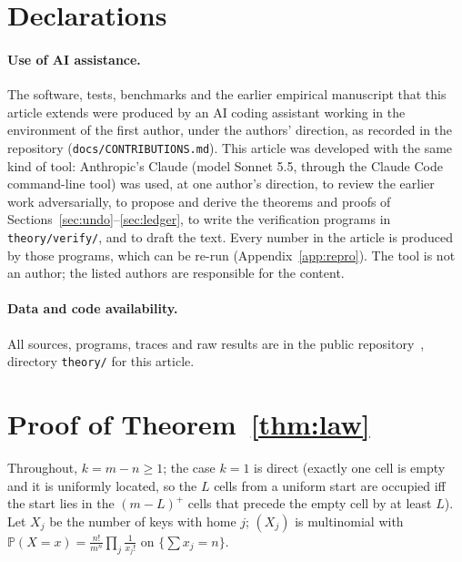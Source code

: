\documentclass[11pt,a4paper]{article}
\theoremstyle{definition}
\theoremstyle{remark}
\newcommand{\Prob}{\mathbb{P}}
\newcommand{\code}[1]{\texttt{#1}}
\begin{document}
\section*{Declarations}
\paragraph{Use of AI assistance.} The software, tests, benchmarks and the earlier empirical manuscript that this article extends were produced by an AI coding assistant working in the environment of the first author, under the authors' direction, as recorded in the repository (\code{docs/CONTRIBUTIONS.md}). This article was developed with the same kind of tool: Anthropic's Claude (model Sonnet 5.5, through the Claude Code command-line tool) was used, at one author's direction, to review the earlier work adversarially, to propose and derive the theorems and proofs of Sections~\ref{sec:undo}--\ref{sec:ledger}, to write the verification programs in \code{theory/verify/}, and to draft the text. Every number in the article is produced by those programs, which can be re-run (Appendix~\ref{app:repro}). The tool is not an author; the listed authors are responsible for the content.
\paragraph{Data and code availability.} All sources, programs, traces and raw results are in the public repository~\cite{strata}, directory \code{theory/} for this article.




\appendix
\section{Proof of Theorem~\ref{thm:law}}\label{app:proof}

Throughout, $k=m-n\ge1$; the case $k=1$ is direct (exactly one cell is empty and it is uniformly located, so the $L$ cells from a uniform start are occupied iff the start lies in the $(m-L)^+$ cells that precede the empty cell by at least $L$). Let $X_j$ be the number of keys with home $j$; $(X_j)$ is multinomial with $\Prob(X=x)=\frac{n!}{m^n}\prod_j\frac1{x_j!}$ on $\{\sum x_j=n\}$.
\end{document}
